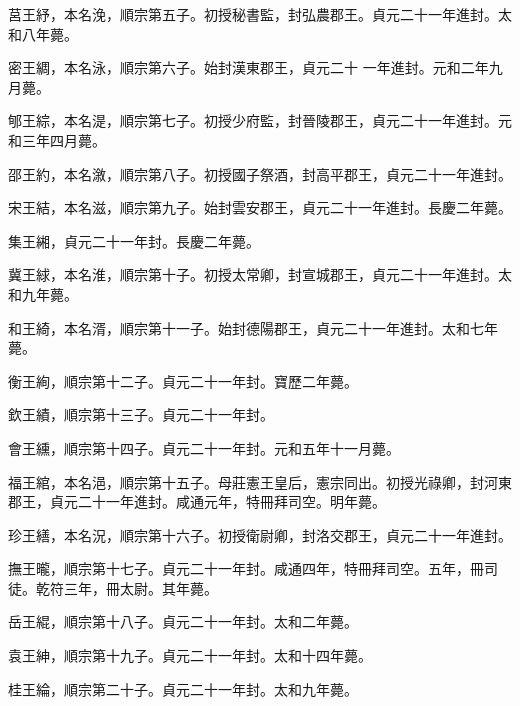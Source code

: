 \begin{pinyinscope}
 莒王紓，本名浼，順宗第五子。初授秘書監，封弘農郡王。貞元二十一年進封。太和八年薨。



 密王綢，本名泳，順宗第六子。始封漢東郡王，貞元二十
 一年進封。元和二年九月薨。



 郇王綜，本名湜，順宗第七子。初授少府監，封晉陵郡王，貞元二十一年進封。元和三年四月薨。



 邵王約，本名漵，順宗第八子。初授國子祭酒，封高平郡王，貞元二十一年進封。



 宋王結，本名滋，順宗第九子。始封雲安郡王，貞元二十一年進封。長慶二年薨。



 集王緗，貞元二十一年封。長慶二年薨。



 冀王絿，本名淮，順宗第十子。初授太常卿，封宣城郡王，貞元二十一年進封。太和九年薨。



 和王綺，本名湑，順宗第十一子。始封德陽郡王，貞元二十一年進封。太和七年薨。



 衡王絢，順宗第十二子。貞元二十一年封。寶歷二年薨。



 欽王績，順宗第十三子。貞元二十一年封。



 會王纁，順宗第十四子。貞元二十一年封。元和五年十一月薨。



 福王綰，本名浥，順宗第十五子。母莊憲王皇后，憲宗同出。初授光祿卿，封河東郡王，貞元二十一年進封。咸通元年，特冊拜司空。明年薨。



 珍王繕，本名況，順宗第十六子。初授衛尉卿，封洛交郡王，貞元二十一年進封。



 撫王曨，順宗第十七子。貞元二十一年封。咸通四年，特冊拜司空。五年，冊司徒。乾符三年，冊太尉。其年薨。



 岳王緄，順宗第十八子。貞元二十一年封。太和二年薨。



 袁王紳，順宗第十九子。貞元二十一年封。太和十四年薨。



 桂王綸，順宗第二十子。貞元二十一年封。太和九年薨。




\end{pinyinscope}
